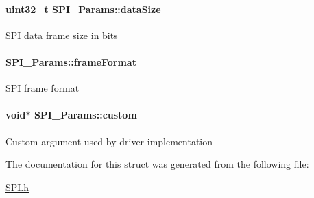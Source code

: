 \paragraph[{data\-Size}]{\setlength{\rightskip}{0pt plus 5cm}uint32\-\_\-t S\-P\-I\-\_\-\-Params\-::data\-Size}\label{struct_s_p_i___params_a30722b1de5e3b089ecf0c669da42ed2d}
S\-P\-I data frame size in bits 
\paragraph[{frame\-Format}]{ S\-P\-I\-\_\-\-Params\-::frame\-Format}\label{struct_s_p_i___params_a67b5ebb8ec72796a0260c427c91cc093}
S\-P\-I frame format 
\paragraph[{custom}]{\setlength{\rightskip}{0pt plus 5cm}void$\ast$ S\-P\-I\-\_\-\-Params\-::custom}\label{struct_s_p_i___params_a909f58a310514d16b4fee1b51033d976}
Custom argument used by driver implementation 

The documentation for this struct was generated from the following file\-:\begin{DoxyCompactItemize}
\item 
\hyperlink{_s_p_i_8h}{S\-P\-I.\-h}\end{DoxyCompactItemize}
